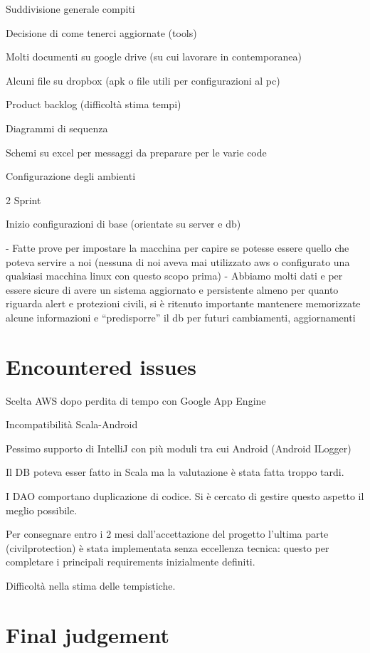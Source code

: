 \documentclass[a4paper,12pt]{report}
\begin{document}
Suddivisione generale compiti 

Decisione di come tenerci aggiornate (tools)

Molti documenti su google drive (su cui lavorare in contemporanea)

Alcuni file su dropbox (apk o file utili per configurazioni al pc)

Product backlog (difficoltà stima tempi)

Diagrammi di sequenza 

Schemi su excel per messaggi da preparare per le varie code

Configurazione degli ambienti

2 Sprint 

Inizio configurazioni di base (orientate su server e db) 


-	Fatte prove per impostare la macchina per capire se potesse essere quello che poteva servire a noi (nessuna di noi aveva mai utilizzato aws o configurato una qualsiasi macchina linux con questo scopo prima)
-	Abbiamo molti dati e per essere sicure di avere un sistema aggiornato e persistente almeno per quanto riguarda alert e protezioni civili, si è ritenuto importante mantenere memorizzate alcune informazioni e “predisporre” il db per futuri cambiamenti, aggiornamenti

\section{Encountered issues}
Scelta AWS dopo perdita di tempo con Google App Engine

Incompatibilità Scala-Android

Pessimo supporto di IntelliJ con più moduli tra cui Android (Android ILogger)

Il DB poteva esser fatto in Scala ma la valutazione è stata fatta troppo tardi.

I DAO comportano duplicazione di codice. Si è cercato di gestire questo aspetto il meglio possibile.

Per consegnare entro i 2 mesi dall'accettazione del progetto l'ultima parte (civilprotection) è stata implementata senza eccellenza tecnica: questo per completare i principali requirements inizialmente definiti.

Difficoltà nella stima delle tempistiche.

\section{Final judgement}
\end{document}
